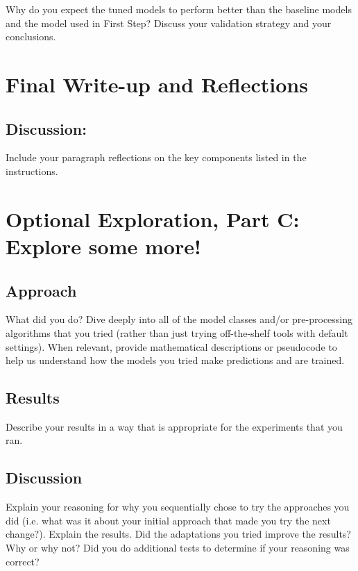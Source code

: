 \documentclass[11pt]{article}
\begin{document}
Why do you expect the tuned models to perform better than the baseline models and the model used in First Step? Discuss your validation strategy and your conclusions.

\section{Final Write-up and Reflections}

\subsection{Discussion:} 

Include your paragraph reflections on the key components listed in the instructions.

\section{Optional Exploration, Part C: Explore some more!}
\subsection{Approach}

What did you do? Dive deeply into all of the model classes and/or pre-processing algorithms that you tried (rather than just trying off-the-shelf tools with default settings).  When relevant, provide mathematical descriptions or pseudocode to help us understand how the models you tried make predictions and are trained. 
  

\subsection{Results}

Describe your results in a way that is appropriate for the experiments that you ran.

\subsection{Discussion}
Explain your reasoning for why you sequentially chose to try the approaches you did (i.e. what was it about your initial approach that made you try the next change?). Explain the results.  Did the adaptations you tried improve the results?  Why or why not?  Did you do additional tests to determine if your reasoning was correct?  
\end{document}
